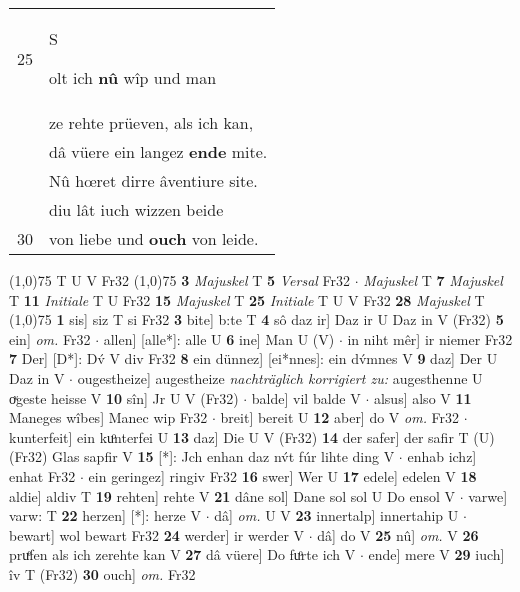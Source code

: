 \documentclass[8pt,a4paper,notitlepage]{article}
\begin{document}
\begin{table}[ht]
\begin{minipage}[t]{0.5\linewidth}
\begin{tabular}{rl}
25 & \begin{large}S\end{large}olt ich \textbf{nû} wîp und man\\ 
 & ze rehte prüeven, als ich kan,\\ 
 & dâ vüere ein langez \textbf{ende} mite.\\ 
 & Nû hœret dirre âventiure site.\\ 
 & diu lât iuch wizzen beide\\ 
30 & von liebe und \textbf{ouch} von leide.\\ 
\end{tabular}
\scriptsize
\line(1,0){75} \newline
T U V Fr32 \newline
\line(1,0){75} \newline
\textbf{3} \textit{Majuskel} T  \textbf{5} \textit{Versal} Fr32   $\cdot$ \textit{Majuskel} T  \textbf{7} \textit{Majuskel} T  \textbf{11} \textit{Initiale} T U Fr32  \textbf{15} \textit{Majuskel} T  \textbf{25} \textit{Initiale} T U V Fr32  \textbf{28} \textit{Majuskel} T  \newline
\line(1,0){75} \newline
\textbf{1} sis] siz T si Fr32 \textbf{3} bite] b:te T \textbf{4} sô daz ir] Daz ir U Daz in V (Fr32) \textbf{5} ein] \textit{om.} Fr32  $\cdot$ allen] [alle*]: alle U \textbf{6} ine] Man U (V)  $\cdot$ in niht mêr] ir niemer Fr32 \textbf{7} Der] [D*]: Dv́ V div Fr32 \textbf{8} ein dünnez] [ei*nnes]: ein dv́mnes V \textbf{9} daz] Der U Daz in V  $\cdot$ ougestheize] augestheize \textit{nachträglich korrigiert zu:} augesthenne U oͮgeste heisse V \textbf{10} sîn] Jr U V (Fr32)  $\cdot$ balde] vil balde V  $\cdot$ alsus] also V \textbf{11} Maneges wîbes] Manec wip Fr32  $\cdot$ breit] bereit U \textbf{12} aber] do V \textit{om.} Fr32  $\cdot$ kunterfeit] ein kuͦnterfei U \textbf{13} daz] Die U V (Fr32) \textbf{14} der safer] der safir T (U) (Fr32) Glas sapfir V \textbf{15} [*]: Jch enhan daz nv́t fúr lihte ding V  $\cdot$ enhab ichz] enhat Fr32  $\cdot$ ein geringez] ringiv Fr32 \textbf{16} swer] Wer U \textbf{17} edele] edelen V \textbf{18} aldie] aldiv T \textbf{19} rehten] rehte V \textbf{21} dâne sol] Dane sol sol U Do ensol V  $\cdot$ varwe] varw: T \textbf{22} herzen] [*]: herze V  $\cdot$ dâ] \textit{om.} U V \textbf{23} innertalp] innertahip U  $\cdot$ bewart] wol bewart Fr32 \textbf{24} werder] ir werder V  $\cdot$ dâ] do V \textbf{25} nû] \textit{om.} V \textbf{26} pruͤfen als ich zerehte kan V \textbf{27} dâ vüere] Do fuͦrte ich V  $\cdot$ ende] mere V \textbf{29} iuch] îv T (Fr32) \textbf{30} ouch] \textit{om.} Fr32 \newline
\end{minipage}
\end{table}
\end{document}
